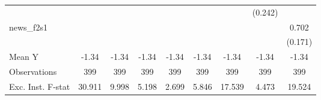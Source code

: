 {\begin{tabular}{l*{8}{c}}
            &                     &                     &                     &                     &                     &                     &     (0.242)         &                     \\
\addlinespace
news\_f2s1   &                     &                     &                     &                     &                     &                     &                     &       0.702\sym{***}\\
            &                     &                     &                     &                     &                     &                     &                     &     (0.171)         \\
\midrule
Mean Y      &       -1.34         &       -1.34         &       -1.34         &       -1.34         &       -1.34         &       -1.34         &       -1.34         &       -1.34         \\
Observations&         399         &         399         &         399         &         399         &         399         &         399         &         399         &         399         \\
Exc. Inst. F-stat&      30.911         &       9.998         &       5.198         &       2.699         &       5.846         &      17.539         &       4.473         &      19.524         \\
\bottomrule
\end{tabular}
}
